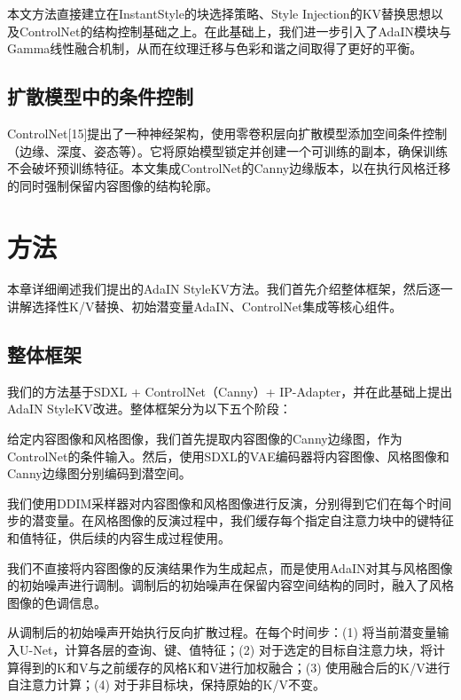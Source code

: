 \documentclass[twocolumn,a4paper,11pt]{ctexart}
\begin{document}
本文方法直接建立在InstantStyle的块选择策略、Style Injection的KV替换思想以及ControlNet的结构控制基础之上。在此基础上，我们进一步引入了AdaIN模块与Gamma线性融合机制，从而在纹理迁移与色彩和谐之间取得了更好的平衡。

\subsection{扩散模型中的条件控制}

ControlNet[15]提出了一种神经架构，使用零卷积层向扩散模型添加空间条件控制（边缘、深度、姿态等）。它将原始模型锁定并创建一个可训练的副本，确保训练不会破坏预训练特征。本文集成ControlNet的Canny边缘版本，以在执行风格迁移的同时强制保留内容图像的结构轮廓。

\section{方法}

本章详细阐述我们提出的AdaIN StyleKV方法。我们首先介绍整体框架，然后逐一讲解选择性K/V替换、初始潜变量AdaIN、ControlNet集成等核心组件。

\subsection{整体框架}

我们的方法基于SDXL + ControlNet（Canny）+ IP-Adapter，并在此基础上提出AdaIN StyleKV改进。整体框架分为以下五个阶段：

\medskip
{} 给定内容图像和风格图像，我们首先提取内容图像的Canny边缘图，作为ControlNet的条件输入。然后，使用SDXL的VAE编码器将内容图像、风格图像和Canny边缘图分别编码到潜空间。

\medskip
{} 我们使用DDIM采样器对内容图像和风格图像进行反演，分别得到它们在每个时间步的潜变量。在风格图像的反演过程中，我们缓存每个指定自注意力块中的键特征和值特征，供后续的内容生成过程使用。

\medskip
{} 我们不直接将内容图像的反演结果作为生成起点，而是使用AdaIN对其与风格图像的初始噪声进行调制。调制后的初始噪声在保留内容空间结构的同时，融入了风格图像的色调信息。

\medskip
{} 从调制后的初始噪声开始执行反向扩散过程。在每个时间步：(1) 将当前潜变量输入U-Net，计算各层的查询、键、值特征；(2) 对于选定的目标自注意力块，将计算得到的K和V与之前缓存的风格K和V进行加权融合；(3) 使用融合后的K/V进行自注意力计算；(4) 对于非目标块，保持原始的K/V不变。
\end{document}

